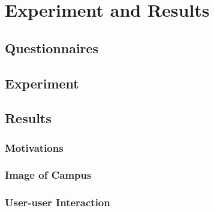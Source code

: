 \chapter{Experiment and Results}\label{ch:5}

\section{Questionnaires}

\section{Experiment}

\section{Results}
\subsection{Motivations}

\subsection{Image of Campus}

\subsection{User-user Interaction}